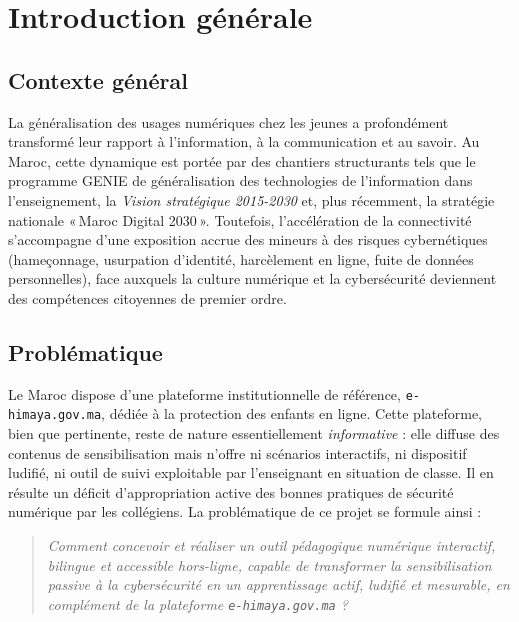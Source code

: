 \documentclass[12pt, a4paper, oneside]{report}
\begin{document}
\clearpage
{}

\chapter*{Introduction générale}

\section*{Contexte général}
La généralisation des usages numériques chez les jeunes a profondément transformé leur rapport à l'information, à la communication et au savoir. Au Maroc, cette dynamique est portée par des chantiers structurants tels que le programme GENIE de généralisation des technologies de l'information dans l'enseignement, la \textit{Vision stratégique 2015-2030} et, plus récemment, la stratégie nationale «\,Maroc Digital 2030\,». Toutefois, l'accélération de la connectivité s'accompagne d'une exposition accrue des mineurs à des risques cybernétiques (hameçonnage, usurpation d'identité, harcèlement en ligne, fuite de données personnelles), face auxquels la culture numérique et la cybersécurité deviennent des compétences citoyennes de premier ordre.

\section*{Problématique}
Le Maroc dispose d'une plateforme institutionnelle de référence, \texttt{e-himaya.gov.ma}, dédiée à la protection des enfants en ligne. Cette plateforme, bien que pertinente, reste de nature essentiellement \textit{informative} : elle diffuse des contenus de sensibilisation mais n'offre ni scénarios interactifs, ni dispositif ludifié, ni outil de suivi exploitable par l'enseignant en situation de classe. Il en résulte un déficit d'appropriation active des bonnes pratiques de sécurité numérique par les collégiens. La problématique de ce projet se formule ainsi :

\begin{quote}
\textit{Comment concevoir et réaliser un outil pédagogique numérique interactif, bilingue et accessible hors-ligne, capable de transformer la sensibilisation passive à la cybersécurité en un apprentissage actif, ludifié et mesurable, en complément de la plateforme \texttt{e-himaya.gov.ma} ?}
\end{quote}
\end{document}
